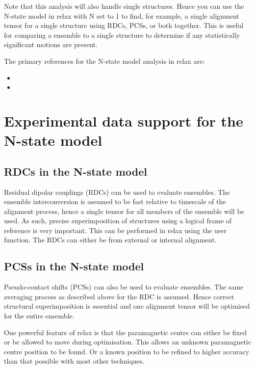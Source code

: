 Note that this analysis will also handle single structures.
Hence you can use the N-state model in relax with N set to 1 to find, for example, a single alignment tensor for a single structure using RDCs, PCSs, or both together.
This is useful for comparing a ensemble to a single structure to determine if any statistically significant motions are present.

The primary references for the N-state model analysis in relax are:
\begin{itemize}
  \item {}
  \item {}
\end{itemize}



 
\section{Experimental data support for the N-state model}

\subsection{RDCs in the N-state model}

Residual dipolar couplings (RDCs) can be used to evaluate ensembles.  
The ensemble interconversion is assumed to be fast relative to timescale of the alignment process, hence a single tensor for all members of the ensemble will be used.
As such, precise superimposition of structures using a logical frame of reference is very important.
This can be performed in relax using the  user function.
The RDCs can either be from external or internal alignment.


\subsection{PCSs in the N-state model}

Pseudo-contact shifts (PCSs) can also be used to evaluate ensembles.  
The same averaging process as described above for the RDC is assumed.
Hence correct structural superimposition is essential and one alignment tensor will be optimised for the entire ensemble.

One powerful feature of relax is that the paramagnetic centre can either be fixed or be allowed to move during optimisation.
This allows an unknown paramagnetic centre position to be found.
Or a known position to be refined to higher accuracy than that possible with most other techniques.


